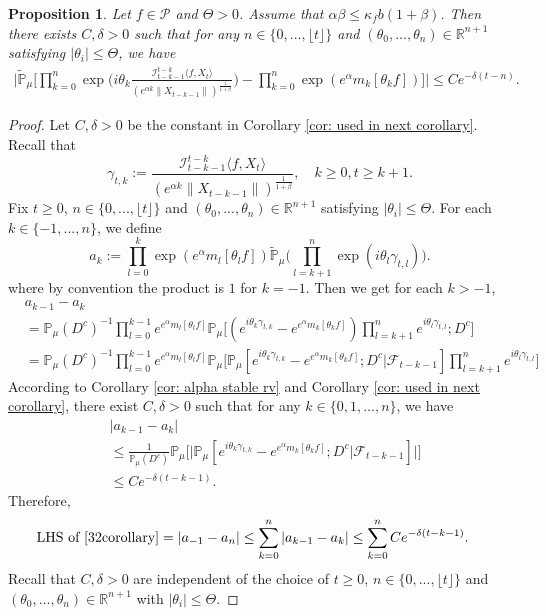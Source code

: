 \documentclass[12pt,oneside,english]{amsart}
\theoremstyle{plain}
\newtheorem{prop}[thm]{Proposition}
\theoremstyle{definition}
\numberwithin{equation}{section}
\begin{document}
\begin{prop}\label{corollary31}
Let $f\in \mathcal{P}$ and $\Theta>0$. Assume that $\alpha\beta\leq\kappa_fb(1+\beta)$. Then there exists $C,\delta>0$ such that for any $n \in \{0,...,\lfloor t \rfloor\}$ and $(\theta_0,...,\theta_n)\in \mathbb{R}^{n+1}$ satisfying $|\theta_i|\leq \Theta$, we have
\begin{align}
\label{32corollary}
    \Big|\mathbb{\tilde{P}}_{\mu}\Big[\prod_{k=0}^n\exp\Big(i\theta_k \frac {\mathcal I_{t-k-1}^{t-k}\langle f ,X_t\rangle}{(e^{\alpha k}\|X_{t-k-1}\|)^\frac{1}{1+\beta}}\Big)-\prod_{k=0}^n\exp(e^{\alpha}m_k[\theta_k f])\Big]\Big|\leq C e^{-\delta(t-n)}.
\end{align}
\end{prop}
\begin{proof}
	Let $C,\delta > 0$ be the constant in Corollary \ref{cor: used in next corollary}.
    Recall that \[\gamma_{t,k}:=\frac {\mathcal I_{t-k-1}^{t-k}\langle f ,X_t\rangle}{(e^{\alpha k}\|X_{t-k-1}\|)^\frac{1}{1+\beta}},\quad k \geq 0, t\geq k+1. \]
    Fix $t\geq 0$, $n \in \{0,...,\lfloor t \rfloor\}$ and $(\theta_0,...,\theta_n)\in \mathbb{R}^{n+1}$ satisfying $|\theta_i|\leq \Theta$.
    For each $k\in\{-1,...,n\}$, we define
    \[a_k:=\prod_{l=0}^{k}\exp(e^{\alpha}m_l[\theta_lf])\mathbb{\tilde{P}}_{\mu}\Big(\prod_{l=k+1}^{n}\exp\left(i\theta_l\gamma_{t,l}\right)\Big).\]
     where by convention the product is $1$ for $k=-1$. Then we get for each $k > -1$,
    \begin{align*}
        &a_{k-1} - a_k
        \\&=\mathbb{P}_{\mu}(D^c)^{-1}\prod_{l=0}^{k-1}e^{e^{\alpha}m_l[\theta_l f]}\mathbb{P}_{\mu}\Big[(e^{i\theta_{k}\gamma_{t,k}}-e^{e^{\alpha}m_k[\theta_k f]})\prod_{l=k+1}^ne^{i\theta_{l}\gamma_{t,l}};D^c\Big]
        \\&=\mathbb{P}_{\mu}(D^c)^{-1}\prod_{l=0}^{k-1}e^{e^{\alpha}m_l[\theta_l f]}\mathbb{P}_{\mu}\Big[\mathbb P_\mu[e^{i\theta_{k}\gamma_{t,k}}-e^{e^{\alpha}m_k[\theta_k f]}; D^c|\mathscr F_{t-k-1}]\prod_{l=k+1}^ne^{i\theta_{l}\gamma_{t,l}}\Big]
    \end{align*}
    According to Corollary \ref{cor: alpha stable rv} and Corollary \ref{cor: used in next corollary}, there exist $C,\delta>0$ such that for any $k\in\{0,1,...,n\}$, we have
    \begin{align*}
        &|a_{k-1}- a_k|
        \\&\leq \frac{1}{\mathbb{P}_{\mu}(D^c)}\mathbb{P}_{\mu}\Big[\big|\mathbb P_\mu[e^{i\theta_{k}\gamma_{t,k}}-e^{e^{\alpha}m_k[\theta_k f]}; D^c\big|\mathscr{F}_{t-k-1}]\big|\Big]
        \\& \leq C e^{-\delta(t-k-1)}.
    \end{align*}
Therefore,
\begin{align}
    \text{LHS of \eqref{32corollary}}&= \left|a_{-1}-a_n\right|
    \leq\sum_{k=0}^n\left|a_{k-1}-a_k\right|
    \leq \sum_{k=0}^n C e^{-\delta(t-k-1)}.
\end{align}
	Recall that $C, \delta>0$ are independent of the choice of $t\geq 0$, $n \in \{0,...,\lfloor t \rfloor\}$ and $(\theta_0,...,\theta_n)\in \mathbb{R}^{n+1}$ with $|\theta_i|\leq \Theta$.
\end{proof}
\end{document}
